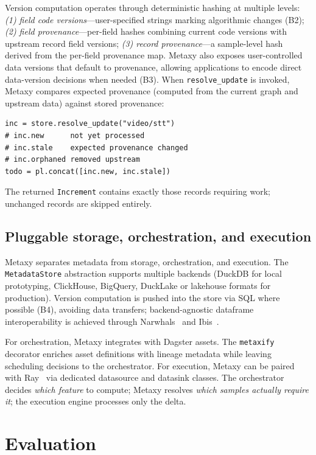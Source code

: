 \documentclass[sigconf]{acmart}
\begin{document}
Version computation operates through deterministic hashing at multiple levels:
\emph{(1) field code versions}---user-specified strings marking algorithmic changes (B2);
\emph{(2) field provenance}---per-field hashes combining current code versions with upstream record field versions;
\emph{(3) record provenance}---a sample-level hash derived from the per-field provenance map.
Metaxy also exposes user-controlled data versions that default to provenance, allowing applications to encode direct data-version decisions when needed (B3).
When \texttt{resolve\_update} is invoked, Metaxy compares expected provenance (computed from the current graph and upstream data) against stored provenance:

\begin{lstlisting}
inc = store.resolve_update("video/stt")
# inc.new      not yet processed
# inc.stale    expected provenance changed
# inc.orphaned removed upstream
todo = pl.concat([inc.new, inc.stale])
\end{lstlisting}

\noindent The returned \texttt{Increment} contains exactly those records requiring work; unchanged records are skipped entirely.

\subsection{Pluggable storage, orchestration, and execution}

Metaxy separates metadata from storage, orchestration, and execution.
The \texttt{MetadataStore} abstraction supports multiple backends (DuckDB for local prototyping, ClickHouse, BigQuery, DuckLake or lakehouse formats for production).
Version computation is pushed into the store via SQL where possible (B4), avoiding data transfers; backend-agnostic dataframe interoperability is achieved through Narwhals~\cite{narwhals} and Ibis~\cite{ibis}.

For orchestration, Metaxy integrates with Dagster assets.
The \texttt{metaxify} decorator enriches asset definitions with lineage metadata while leaving scheduling decisions to the orchestrator.
For execution, Metaxy can be paired with Ray~\cite{ray} via dedicated datasource and datasink classes.
The orchestrator decides \emph{which feature} to compute; Metaxy resolves \emph{which samples actually require it}; the execution engine processes only the delta.

\section{Evaluation}
\label{sec:eval}
\end{document}
